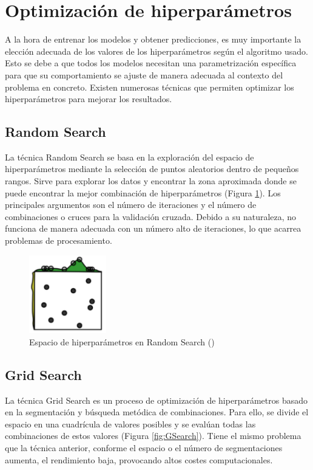 \documentclass[12pt,a4paper]{report}
\begin{document}
\section{Optimización de hiperparámetros}

A la hora de entrenar los modelos y obtener predicciones, es muy importante la elección adecuada de los valores de los hiperparámetros según el algoritmo usado. Esto se debe a que todos los modelos necesitan una parametrización específica para que su comportamiento se ajuste de manera adecuada al contexto del problema en concreto. Existen numerosas técnicas que permiten optimizar los hiperparámetros para mejorar los resultados.


\subsection{Random Search}

La técnica Random Search se basa en la exploración del espacio de hiperparámetros mediante la selección de puntos aleatorios dentro de pequeños rangos. Sirve para explorar los datos y encontrar la zona aproximada donde se puede encontrar la mejor combinación de hiperparámetros (Figura \ref{fig:RSearch}). Los principales argumentos son el número de iteraciones y el número de combinaciones o cruces para la validación cruzada. Debido a su naturaleza, no funciona de manera adecuada con un número alto de iteraciones, lo que acarrea problemas de procesamiento.

\begin{figure}[H]
    \centering
    \includegraphics[width=0.3\textwidth]{Images/tfm-2.7.png}
    \caption{Espacio de hiperparámetros en Random Search (\cite{gonzalezdorado2024ML})}
    \label{fig:RSearch}
\end{figure}

\subsection{Grid Search}

La técnica Grid Search es un proceso de optimización de hiperparámetros basado en la segmentación y búsqueda metódica de combinaciones. Para ello, se divide el espacio en una cuadrícula de valores posibles y se evalúan todas las combinaciones de estos valores (Figura \ref{fig:GSearch}). Tiene el mismo problema que la técnica anterior, conforme el espacio o el número de segmentaciones aumenta, el rendimiento baja, provocando altos costes computacionales. 
\end{document}
